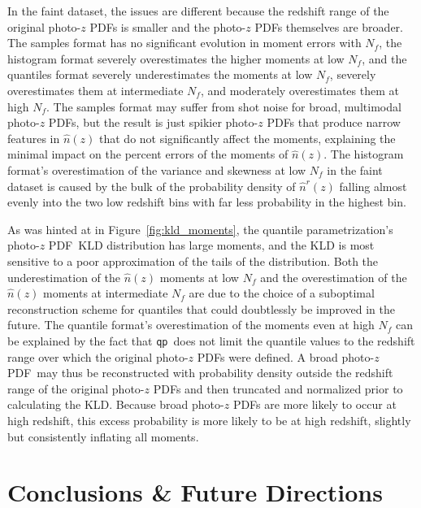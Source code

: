 \documentclass[\docopts]{\docclass}
\newcommand{\qp}{\texttt{qp}}
\newcommand{\pz}{photo-$z$ PDF}
\newcommand{\ssdata}{faint\xspace}
\begin{document}
In the \ssdata dataset, the issues are different because the redshift range of 
the original \pz s is smaller and the \pz s themselves are broader.
The samples format has no significant evolution in moment errors with $N_{f}$, 
the histogram format severely overestimates the higher moments at low $N_{f}$, 
and the quantiles format severely underestimates the moments at low $N_{f}$, 
severely overestimates them at intermediate $N_{f}$, and moderately 
overestimates them at high $N_{f}$.
The samples format may suffer from shot noise for broad, multimodal \pz s, but 
the result is just spikier \pz s that produce narrow features in $\hat{n}(z)$ 
that do not significantly affect the moments, explaining the minimal impact on 
the percent errors of the moments of $\hat{n}(z)$.
The histogram format's overestimation of the variance and skewness at low 
$N_{f}$ in the \ssdata dataset is caused by the bulk of the probability density 
of $\hat{n}^{r}(z)$ falling almost evenly into the two low redshift bins with 
far less probability in the highest bin.

As was hinted at in Figure~\ref{fig:kld_moments}, the quantile 
parametrization's \pz\ KLD distribution has large moments, and the KLD is most 
sensitive to a poor approximation of the tails of the distribution.
Both the underestimation of the $\hat{n}(z)$ moments at low $N_{f}$ and the 
overestimation of the $\hat{n}(z)$ moments at intermediate $N_{f}$ are due to 
the choice of a suboptimal reconstruction scheme for quantiles that could 
doubtlessly be improved in the future.
The quantile format's overestimation of the moments even at high $N_{f}$ can be 
explained by the fact that \qp\ does not limit the quantile values to the 
redshift range over which the original \pz s were defined.
A broad \pz\ may thus be reconstructed with probability density outside the 
redshift range of the original \pz s and then truncated and normalized prior to 
calculating the KLD.
Because broad \pz s are more likely to occur at high redshift, this excess 
probability is more likely to be at high redshift, slightly but consistently 
inflating all moments.


\section{Conclusions \& Future Directions}
\label{sec:conclusions}
\end{document}

